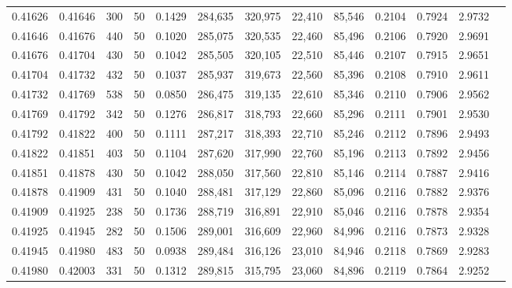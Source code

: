 \begin{tabular}{rrrrrrrrrrrrr}
0.41626 & 0.41646 &   300 &  50 &                                     0.1429 & 284,635 & 320,975 &  22,410 &  85,546 & 0.2104 & 0.7924 & 2.9732 \\
0.41646 & 0.41676 &   440 &  50 &                                     0.1020 & 285,075 & 320,535 &  22,460 &  85,496 & 0.2106 & 0.7920 & 2.9691 \\
0.41676 & 0.41704 &   430 &  50 &                                     0.1042 & 285,505 & 320,105 &  22,510 &  85,446 & 0.2107 & 0.7915 & 2.9651 \\
0.41704 & 0.41732 &   432 &  50 &                                     0.1037 & 285,937 & 319,673 &  22,560 &  85,396 & 0.2108 & 0.7910 & 2.9611 \\
0.41732 & 0.41769 &   538 &  50 &                                     0.0850 & 286,475 & 319,135 &  22,610 &  85,346 & 0.2110 & 0.7906 & 2.9562 \\
0.41769 & 0.41792 &   342 &  50 &                                     0.1276 & 286,817 & 318,793 &  22,660 &  85,296 & 0.2111 & 0.7901 & 2.9530 \\
0.41792 & 0.41822 &   400 &  50 &                                     0.1111 & 287,217 & 318,393 &  22,710 &  85,246 & 0.2112 & 0.7896 & 2.9493 \\
0.41822 & 0.41851 &   403 &  50 &                                     0.1104 & 287,620 & 317,990 &  22,760 &  85,196 & 0.2113 & 0.7892 & 2.9456 \\
0.41851 & 0.41878 &   430 &  50 &                                     0.1042 & 288,050 & 317,560 &  22,810 &  85,146 & 0.2114 & 0.7887 & 2.9416 \\
0.41878 & 0.41909 &   431 &  50 &                                     0.1040 & 288,481 & 317,129 &  22,860 &  85,096 & 0.2116 & 0.7882 & 2.9376 \\
0.41909 & 0.41925 &   238 &  50 &                                     0.1736 & 288,719 & 316,891 &  22,910 &  85,046 & 0.2116 & 0.7878 & 2.9354 \\
0.41925 & 0.41945 &   282 &  50 &                                     0.1506 & 289,001 & 316,609 &  22,960 &  84,996 & 0.2116 & 0.7873 & 2.9328 \\
0.41945 & 0.41980 &   483 &  50 &                                     0.0938 & 289,484 & 316,126 &  23,010 &  84,946 & 0.2118 & 0.7869 & 2.9283 \\
0.41980 & 0.42003 &   331 &  50 &                                     0.1312 & 289,815 & 315,795 &  23,060 &  84,896 & 0.2119 & 0.7864 & 2.9252 \\

\end{tabular}
